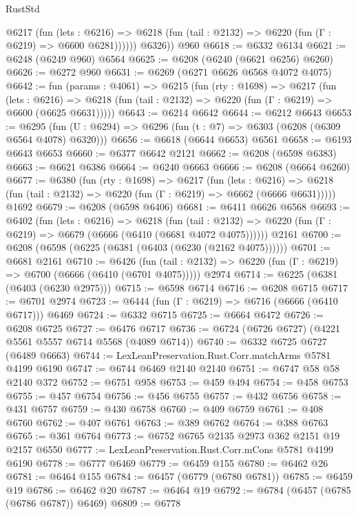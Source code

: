 \begin{lexlean}{RustStd}
\begin{coremodule}
            @6217
              (fun (lets : @6216) =>
              @6218 (fun (tail : @2132) => @6220 (fun (Γ : @6219) => @6600 @6281))))))
        @6326))
    @960
@6618 := @6332 @6134
@6621 := @6248 (@6249 @960) @6564
@6625 := @6208 (@6240 (@6621 @6256) @6260)
@6626 := @6272 @960
@6631 := @6269 (@6271 @6626 @6568 @4072 @4075)
@6642 := fun (params : @4061) =>
  @6215
    (fun (rty : @1698) =>
    @6217
      (fun (lets : @6216) =>
      @6218 (fun (tail : @2132) => @6220 (fun (Γ : @6219) => @6600 (@6625 @6631)))))
@6643 := @6214 @6642
@6644 := @6212 @6643
@6653 := @6295 (fun (U : @6294) => @6296 (fun (t : @7) => @6303 (@6208 (@6309 @6564 @4078) @6320)))
@6656 := @6618 (@6644 @6653) @6561
@6658 := @6193 @6643 @6653
@6660 := @6377 @6642 @2121
@6662 := @6208 (@6598 @6383)
@6663 := @6621 @6386
@6664 := @6240 @6663
@6666 := @6208 (@6664 @6260)
@6677 := @6380
    (fun (rty : @1698) =>
    @6217
      (fun (lets : @6216) =>
      @6218 (fun (tail : @2132) => @6220 (fun (Γ : @6219) => @6662 (@6666 @6631)))))
    @1692
@6679 := @6208 (@6598 @6406)
@6681 := @6411 @6626 @6568
@6693 := @6402
    (fun (lets : @6216) =>
    @6218
      (fun (tail : @2132) => @6220 (fun (Γ : @6219) => @6679 (@6666 (@6410 (@6681 @4072 @4075))))))
    @2161
@6700 := @6208 (@6598 (@6225 (@6381 (@6403 (@6230 (@2162 @4075))))))
@6701 := @6681 @2161
@6710 := @6426
    (fun (tail : @2132) => @6220 (fun (Γ : @6219) => @6700 (@6666 (@6410 (@6701 @4075)))))
    @2974
@6714 := @6225 (@6381 (@6403 (@6230 @2975)))
@6715 := @6598 @6714
@6716 := @6208 @6715
@6717 := @6701 @2974
@6723 := @6444 (fun (Γ : @6219) => @6716 (@6666 (@6410 @6717))) @6469
@6724 := @6332 @6715
@6725 := @6664 @6472
@6726 := @6208 @6725
@6727 := @6476 @6717
@6736 := @6724 (@6726 @6727) (@4221 @5561 @5557 @6714 @5568 (@4089 @6714))
@6740 := @6332 @6725 @6727 (@6489 @6663)
@6744 := LexLeanPreservation.Rust.Corr.matchArms @5781 @4199 @6190
@6747 := @6744 @6469 @2140 @2140
@6751 := @6747 @58 @58 @2140 @372
@6752 := @6751 @958
@6753 := @459 @494
@6754 := @458 @6753
@6755 := @457 @6754
@6756 := @456 @6755
@6757 := @432 @6756
@6758 := @431 @6757
@6759 := @430 @6758
@6760 := @409 @6759
@6761 := @408 @6760
@6762 := @407 @6761
@6763 := @389 @6762
@6764 := @388 @6763
@6765 := @361 @6764
@6773 := @6752 @6765 @2135 @2973 @362 @2151 @19 @2157 @6550
@6777 := LexLeanPreservation.Rust.Corr.mCons @5781 @4199 @6190
@6778 := @6777 @6469
@6779 := @6459 @155
@6780 := @6462 @26
@6781 := @6464 @155
@6784 := @6457 (@6779 (@6780 @6781))
@6785 := @6459 @19
@6786 := @6462 @20
@6787 := @6464 @19
@6792 := @6784 (@6457 (@6785 (@6786 @6787)) @6469)
@6809 := @6778

\end{coremodule}
\end{lexlean}
